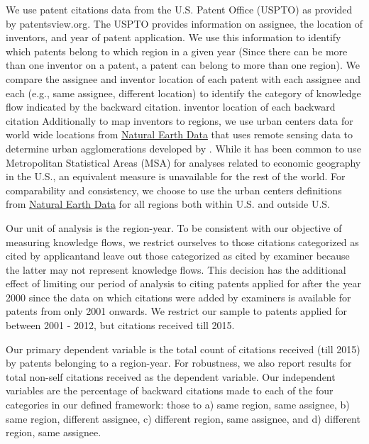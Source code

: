 \documentclass[parskip=full,10pt,letterpaper]{article}
\begin{document}
We use patent citations data from the U.S. Patent Office (USPTO) as provided by patentsview.org. The USPTO provides information on assignee, the location of inventors, and year of patent application. We use this information to identify which patents belong to which region in a given year (Since there can be more than one inventor on a patent, a patent can belong to more than one region). We compare the assignee and inventor location of each patent with each assignee and each (e.g., same assignee, different location) to identify the category of knowledge flow indicated by the backward citation. inventor location of each backward citation Additionally to map inventors to regions, we use urban centers data for world wide locations from \href{http://www.naturalearthdata.com/downloads/10m-cultural-vectors/}{Natural Earth Data} that uses remote sensing data to determine urban agglomerations developed by \cite{Schneider2003}.  While it has been common to use Metropolitan Statistical Areas (MSA) for analyses related to economic geography in the U.S., an equivalent measure is unavailable for the rest of the world. For comparability and consistency, we choose to use the urban centers definitions from \href{http://www.naturalearthdata.com/downloads/10m-cultural-vectors/}{Natural Earth Data} for all regions both within U.S. and outside U.S. \par
Our unit of analysis is the region-year. To be consistent with our objective of measuring knowledge flows, we restrict ourselves to those citations categorized as \textquotesingle cited by applicant\textquotesingle and leave out those categorized as \textquotesingle cited by examiner \textquotesingle because the latter may not represent knowledge flows. This decision has the additional effect of limiting our period of analysis to citing patents applied for after the year 2000 since the data on which citations were added by examiners is available for patents from only 2001 onwards. We restrict our sample to patents applied for between 2001 - 2012, but citations received till 2015. \par
Our primary dependent variable is the  total count of citations received (till 2015) by patents belonging to a region-year. For robustness, we also report results for total non-self citations received as the dependent variable. Our independent variables are the percentage of backward citations made to each of the four categories in our defined framework: those to a) same region, same assignee, b) same region, different assignee, c) different region, same assignee, and d) different region, same assignee. \par
\end{document}
